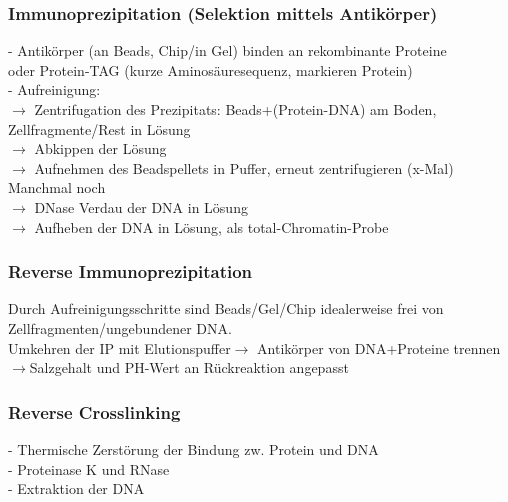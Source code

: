 \subsubsection{Immunoprezipitation (Selektion mittels Antikörper)}
\hspace*{10mm}- Antikörper (an Beads, Chip/in Gel) binden an rekombinante Proteine\\
\hspace*{13mm}oder Protein-TAG (kurze Aminosäuresequenz, markieren Protein)\\
\hspace*{10mm}-	Aufreinigung:\\
\hspace*{15mm}$\rightarrow$ Zentrifugation des Prezipitats: Beads+(Protein-DNA) am Boden,\\
\hspace*{21mm}Zellfragmente/Rest in Lösung\\
\hspace*{15mm}$\rightarrow$ Abkippen der Lösung\\
\hspace*{15mm}$\rightarrow$ Aufnehmen des Beadspellets in Puffer, erneut zentrifugieren (x-Mal)\\ 
\hspace*{15mm}Manchmal noch\\
\hspace*{15mm}$\rightarrow$ DNase Verdau der DNA in Lösung\\
\hspace*{15mm}$\rightarrow$ Aufheben der DNA in Lösung, als total-Chromatin-Probe

\subsubsection{Reverse Immunoprezipitation}
Durch Aufreinigungsschritte sind Beads/Gel/Chip idealerweise frei von Zellfragmenten/ungebundener DNA.\\Umkehren der IP mit Elutionspuffer$\rightarrow$ Antikörper von DNA+Proteine trennen\\
$\rightarrow$Salzgehalt und PH-Wert an Rückreaktion angepasst

\subsubsection{Reverse Crosslinking}
\hspace*{10mm}-	Thermische Zerstörung der Bindung zw. Protein und DNA\\
\hspace*{10mm}-	Proteinase K und RNase\\
\hspace*{10mm}-	Extraktion der DNA\\

